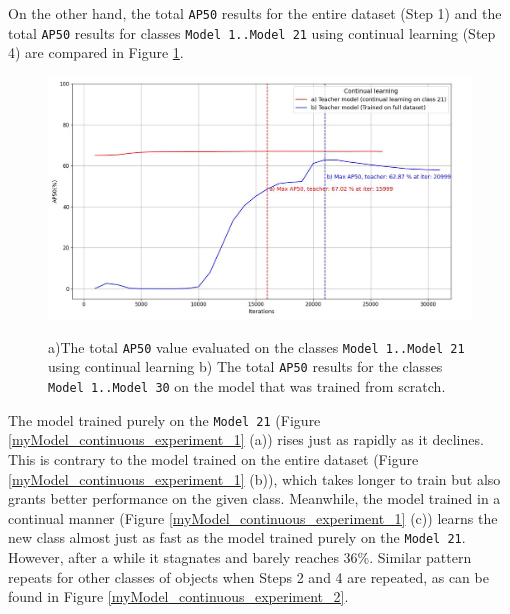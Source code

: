 On the other hand, the total \texttt{AP50} results for the entire dataset (Step 1) and the total \texttt{AP50} results for classes \texttt{Model 1..Model 21} using continual learning (Step 4) are compared in Figure \ref{myModel_continuous_experiment_0}.

\begin{figure}[htb]
	\begin{center}
		\includegraphics[width=14cm]{./AP50_continual_21_allClasses.jpg}
	\end{center}
	\caption{a)The total \texttt{AP50} value evaluated on the classes \texttt{Model 1..Model 21} using continual learning b) The total \texttt{AP50} results for the classes \texttt{Model 1..Model 30} on the model that was trained from scratch.}
	\begin{center}
	\label{myModel_continuous_experiment_0}
	\end{center}
\end{figure}
\FloatBarrier


The model trained purely on the \texttt{Model 21} (Figure \ref{myModel_continuous_experiment_1} (a))  rises just as rapidly as it declines. This is contrary to the model trained on the entire dataset (Figure \ref{myModel_continuous_experiment_1} (b)), which takes longer to train but also grants better performance on the given class. Meanwhile, the model trained in a continual manner (Figure \ref{myModel_continuous_experiment_1} (c)) learns the new class almost just as fast as the model trained purely on the \texttt{Model 21}. However, after a while it stagnates and barely reaches 36\%. Similar pattern repeats for other classes of objects when Steps 2 and 4 are repeated, as can be found in Figure \ref{myModel_continuous_experiment_2}.

